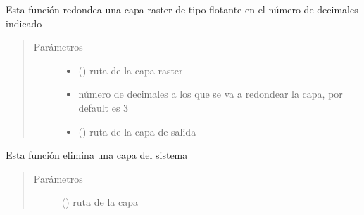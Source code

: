 \documentclass[letterpaper,10pt,spanish]{sphinxmanual}
\begin{document}
\begin{fulllineitems}
\label{\detokenize{apcsig:apcsig.redondea_raster}}
Esta función redondea una capa raster de tipo flotante en el número de decimales indicado
\begin{quote}\begin{description}
\item[{Parámetros}] \leavevmode\begin{itemize}
\item {} 
 () \textendash{} ruta de la capa raster

\item {} 
 \textendash{} número de decimales a los que se va a redondear la capa, por default es 3

\item {} 
 () \textendash{} ruta de la capa de salida

\end{itemize}

\end{description}\end{quote}

\end{fulllineitems}


\begin{fulllineitems}
\label{\detokenize{apcsig:apcsig.remove_raster}}
Esta función elimina una capa del sistema
\begin{quote}\begin{description}
\item[{Parámetros}] \leavevmode
{} () \textendash{} ruta de la capa

\end{description}\end{quote}

\end{fulllineitems}
\end{document}
